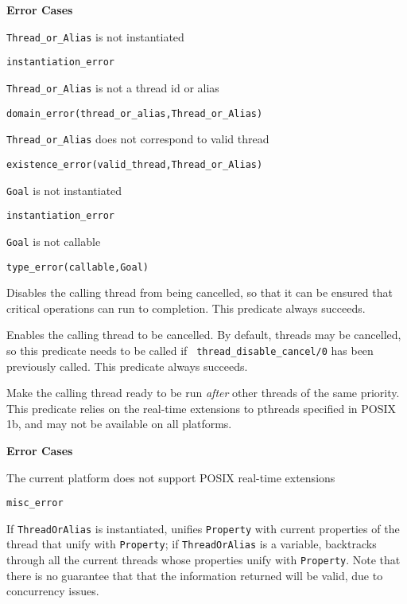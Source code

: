 \begin{description}
{\bf Error Cases}
\bi
\item 	{\tt Thread\_or\_Alias} is not instantiated
\bi
\item 	{\tt instantiation\_error}
\ei
%
\item 	{\tt Thread\_or\_Alias} is not a thread id or alias
\bi
\item 	{\tt domain\_error(thread\_or\_alias,Thread\_or\_Alias)}
\ei
%
\item   {\tt Thread\_or\_Alias} does not correspond to valid thread
\bi
\item   {\tt existence\_error(valid\_thread,Thread\_or\_Alias)}
\ei
\item   {\tt Goal} is not instantiated
\bi
\item 	{\tt instantiation\_error}
\ei
\item   {\tt Goal} is not callable
\bi
\item 	{\tt type\_error(callable,Goal)}
\ei
\ei

% 
Disables the calling thread from being cancelled, so that it can be
ensured that critical operations can run to completion.  This
predicate always succeeds.

% 
Enables the calling thread to be cancelled.  By default, threads may
be cancelled, so this predicate needs to be called if {\tt
  thread\_disable\_cancel/0} has been previously called.  This
predicate always succeeds.

% 
Make the calling thread ready to be run {\em after} other threads of
the same priority.  This predicate relies on the real-time extensions
to pthreads specified in POSIX 1b, and may not be available on all
platforms.

{\bf Error Cases}
\bi
\item 	The current platform does not support POSIX real-time extensions
\bi
\item 	{\tt misc\_error}
\ei
\ei

%
If {\tt ThreadOrAlias} is instantiated, unifies {\tt Property} with
current properties of the thread that unify with {\tt Property}; if
{\tt ThreadOrAlias} is a variable, backtracks through all the current
threads whose properties unify with {\tt Property}.  Note that there
is no guarantee that that the information returned will be valid, due
to concurrency issues.


\end{description}
